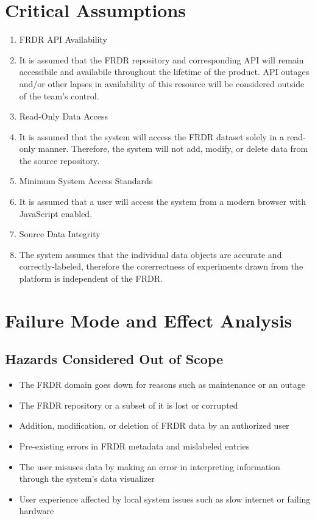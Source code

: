 \documentclass{article}
\begin{document}
\section{Critical Assumptions}


\begin{enumerate}
    \item FRDR API Availability
    \item[] It is assumed that the FRDR repository and corresponding API will remain accessibile and availabile throughout the lifetime of the product. API outages and/or other lapses in availability of this resource will be considered outside of the team's control. 
    \item Read-Only Data Access
    \item[] It is assumed that the system will access the FRDR dataset solely in a read-only manner. Therefore, the system will not add, modify, or delete data from the source repository. 
    \item Minimum System Access Standards
    \item[] It is assumed that a user will access the system from a modern browser with JavaScript enabled. 
    \item Source Data Integrity 
    \item [] The system assumes that the individual data objects are accurate and correctly-labeled, therefore the corerrectness of experiments drawn from the platform is independent of the FRDR. 
\end{enumerate}

\section{Failure Mode and Effect Analysis}

\subsection{Hazards Considered Out of Scope}

\begin{itemize}
    \item The FRDR domain goes down for reasons such as maintenance or an outage
    \item The FRDR repository or a subset of it is lost or corrupted
    \item Addition, modification, or deletion of FRDR data by an authorized user
    \item Pre-existing errors in FRDR metadata and mislabeled entries
    \item The user misuses data by making an error in interpreting information through the system's data visualizer
    \item User experience affected by local system issues such as slow internet or failing hardware
\end{itemize}
\end{document}
